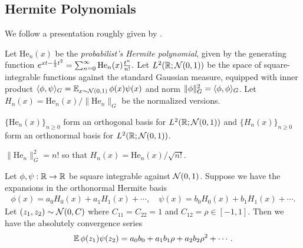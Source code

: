 \documentclass[main.tex]{subfiles}
\begin{document}
\subsection{Hermite Polynomials}
We follow a presentation roughly given by \citet{odonnell_analysis_2014}.

\newcommand{\pHerm}{\mathrm{He}}
\newcommand{\Herm}{H}

\begin{defn}
Let $\pHerm_n(x)$ be the {\it probabilist's Hermite polynomial}, given by the generating function $e^{xt - \f 1 2 t^2} = \sum_{n=0}^\infty \pHerm_n(x) \f{t^n}{n!}.$
Let $L^2(\mathbb{R}; \mathcal{N}(0, 1))$ be the space of square-integrable functions against the standard Gaussian measure, equipped with inner product $\langle \phi, \psi \rangle_G = \operatorname*{\mathbb{E}}_{x \sim \mathcal{N}(0, 1)} \phi(x) \psi(x)$ and norm $\|\phi\|_G^2 = \langle \phi, \phi \rangle_G$.
Let $\Herm_n(x) = \pHerm_n(x) / \|\pHerm_n\|_G$ be the normalized versions.
\end{defn}

\begin{fact}
$\{\pHerm_n(x)\}_{n \ge 0}$ form an orthogonal basis for $L^2(\mathbb{R}; \mathcal{N}(0, 1))$ and $\{\Herm_n(x)\}_{n \ge 0}$ form an orthonormal basis for $L^2(\mathbb{R}; \mathcal{N}(0, 1))$.
\end{fact}
\begin{fact}
$\|\pHerm_n\|_G^2 = n!$ so that $\Herm_n(x) = \pHerm_n(x)/\sqrt{n!}$.
\end{fact}

\begin{fact}\label{fact:hermiteInnerproduct}
  Let $\phi, \psi: \mathbb{R} \to \mathbb{R}$ be square integrable against $\mathcal{N}(0, 1)$.
  Suppose we have the expansions in the orthonormal Hermite basis
  \begin{align*}
    \phi(x) = a_0 H_0(x) + a_{1} H_1(x) + \cdots,\quad
    \psi(x) = b_0 H_0(x) + b_{1} H_1(x) + \cdots.
  \end{align*}
  Let $(z_1, z_2) \sim \mathcal{N}(0, C)$ where $C_{11} = C_{22} = 1$ and $C_{12} = \rho \in [-1, 1]$.
  Then we have the absolutely convergence series
  \begin{align*}
    \operatorname*{\mathbb{E}} \phi(z_1)\psi(z_2) = a_0 b_0 + a_1 b_1 \rho + a_2 b_2 \rho^2 + \cdots.
  \end{align*}
\end{fact}
\end{document}
